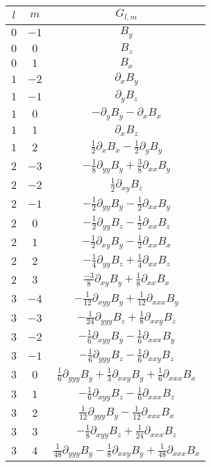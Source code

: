 \documentclass{article}
\begin{document}
{\renewcommand{\arraystretch}{1.4}
\begin{table}[h!]
\begin{center}
    \begin{tabular}{ |c|c|c| }
        \hline
        $l$ & $m$ & $G_{l,m}$ \\
        \hline
        $0$ & $-1$ & $B_y$ \\
        $0$ & $0$ & $B_z$ \\
        $0$ & $1$ & $B_x$ \\
        $1$ & $-2$ & $\partial_xB_y$ \\
        $1$ & $-1$ & $\partial_yB_z$ \\
        $1$ & $0$ & $-\partial_yB_y-\partial_xB_x$ \\
        $1$ & $1$ & $\partial_xB_z$ \\
        $1$ & $2$ & $\frac12\partial_xB_x-\frac12\partial_yB_y$ \\
        \hline
        $2$ & $-3$ & $-\frac18\partial_{yy}B_y+\frac38\partial_{xx}B_y$ \\
        $2$ & $-2$ & $\frac12\partial_{xy}B_z$ \\
        $2$ & $-1$ & $-\frac12\partial_{yy}B_y-\frac12\partial_{xx}B_y$ \\
        $2$ & $0$ & $-\frac12\partial_{yy}B_z-\frac12\partial_{xx}B_z$ \\
        $2$ & $1$ & $-\frac12\partial_{xy}B_y-\frac12\partial_{xx}B_x$ \\
        $2$ & $2$ & $-\frac14\partial_{yy}B_z+\frac14\partial_{xx}B_z$ \\
        $2$ & $3$ & $\frac{-3}8\partial_{xy}B_y+\frac18\partial_{xx}B_x$ \\
        \hline
        $3$ & $-4$ & $-\frac1{12}\partial_{xyy}B_y+\frac1{12}\partial_{xxx}B_y$ \\
        $3$ & $-3$ & $-\frac1{24}\partial_{yyy}B_z+\frac18\partial_{xxy}B_z$ \\
        $3$ & $-2$ & $-\frac16\partial_{xyy}B_y-\frac16\partial_{xxx}B_y$ \\
        $3$ & $-1$ & $-\frac16\partial_{yyy}B_z-\frac16\partial_{xxy}B_z$ \\
        $3$ & $0$ & $\frac16\partial_{yyy}B_y+\frac13\partial_{xxy}B_y+\frac16\partial_{xxx}B_x$ \\
        $3$ & $1$ & $-\frac16\partial_{xyy}B_z-\frac16\partial_{xxx}B_z$ \\
        $3$ & $2$ & $\frac1{12}\partial_{yyy}B_y-\frac1{12}\partial_{xxx}B_x$ \\
        $3$ & $3$ & $-\frac18\partial_{xyy}B_z+\frac1{24}\partial_{xxx}B_z$ \\
        $3$ & $4$ & $\frac1{48}\partial_{yyy}B_y-\frac18\partial_{xxy}B_y+\frac1{48}\partial_{xxx}B_x$ \\


\end{tabular}
\end{center}
\end{table}}
\end{document}
